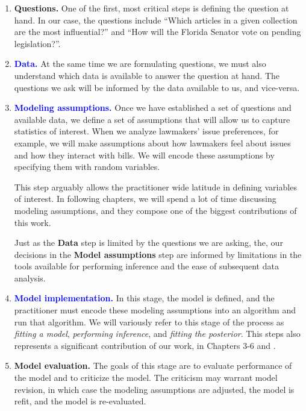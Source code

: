 \begin{enumerate}
\item \textbf{Questions.} One of the first, most critical steps is
  defining the question at hand.  In our case, the questions include
  ``Which articles in a given collection are the most influential?''
  and ``How will the Florida Senator vote on pending legislation?''.

\item \textcolor{blue}{\textbf{Data.}} At the same time we are
  formulating questions, we must also understand which data is
  available to answer the question at hand.  The questions we ask will
  be informed by the data available to us, and vice-versa.

\item \textcolor{blue}{\textbf{Modeling assumptions.}} Once we have
  established a set of questions and available data, we define a set
  of assumptions that will allow us to capture statistics of interest.
  When we analyze lawmakers' issue preferences, for example, we will
  make assumptions about how lawmakers feel about issues and how they
  interact with bills.  We will encode these assumptions by specifying
  them with random variables.

  This step arguably allows the practitioner wide latitude in defining
  variables of interest.  In following chapters, we will spend a lot
  of time discussing modeling assumptions, and they compose one of the
  biggest contributions of this work.

  Just as the \textbf{Data} step is limited by the questions we are
  asking, the, our decisions in the \textbf{Model assumptions} step
  are informed by limitations in the tools available for performing
  inference and the ease of subsequent data analysis.

  \item \textcolor{blue}{\textbf{Model implementation.}} In this stage, the model is
  defined, and the practitioner must encode these modeling assumptions
  into an algorithm and run that algorithm.  We will variously refer
  to this stage of the process as \emph{fitting a model},
  \emph{performing inference}, and \emph{fitting the posterior}.  This
  steps also represents a significant contribution of our work, in
  Chapters 3-6 and .

  \item \textbf{Model evaluation.} The goals of this stage are to
    evaluate performance of the model and to criticize the model.
    The criticism may warrant model revision, in which case the
    modeling assumptions are adjusted, the model is refit, and the
    model is re-evaluated.


\end{enumerate}

